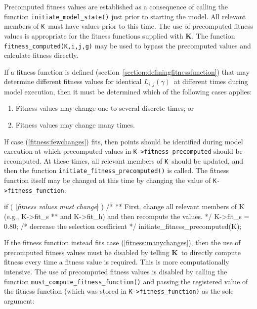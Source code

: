 \documentclass[12pt,twoside,letterpaper,fleqn]{report}
\numberwithin{equation}{section}  %
\newcommand{\K}{{\bf K}}
\newcommand{\KK}{\mbox{{\tt K}}}  %
\newcommand{\Lijg}{\mbox{$L_{i,j}(\gamma)$}}     %
\begin{document}
{Precomputed fitness values are established as a consequence of calling the
function \lstinline{initiate_model_state()} just prior to starting the model.
All relevant members of \KK\ must have values prior to this time.  The use of
precomputed fitness values is appropriate for the fitness functions supplied
with \K.  The function \lstinline{fitness_computed(K,i,j,g)} may be used to
bypass the precomputed values and calculate fitness directly.

If a fitness function is defined
(section~\ref{section:definingfitnessfunction}) that may determine different
fitness values for identical \Lijg\ at different times during model execution,
then it must be determined which of the following cases applies:

\begin{enumerate}
	\item\label{fitness:fewchanges} Fitness values may change one to several discrete times; or
	\item\label{fitness:manychanges} Fitness values may change many times. 
\end{enumerate}

If case (\ref{fitness:fewchanges}) fits, then points should be identified
during model execution at which precomputed values in
\lstinline{K->fitness_precomputed} should be recomputed.  At these times, all
relevant members of \KK\ should be updated, and then the function
\lstinline{initiate_fitness_precomputed()} is called.  The fitness function
itself may be changed at this time by changing the value of
\lstinline{K->fitness_function}:

\begin{C}[gobble=4,escapechar=|]
    if ( |{\it fitness values must change}| ) {
        /*
        ** First, change all relevant members of K (e.g., K->fit_s 
        ** and K->fit_h) and then recompute the values.
        */
        K->fit_s = 0.80;  /* decrease the selection coefficient */
        initiate_fitness_precomputed(K);
    }
\end{C}

If the fitness function instead fits case (\ref{fitness:manychanges}), then the
use of precomputed fitness values must be disabled by telling \K\ to directly
compute fitness every time a fitness value is required.  This is more
computationally intensive.  The use of precomputed fitness values is disabled
by calling the function \lstinline{must_compute_fitness_function()} and passing
the registered value of the fitness function (which was stored in
\lstinline{K->fitness_function)} as the sole argument:

}
\end{document}
